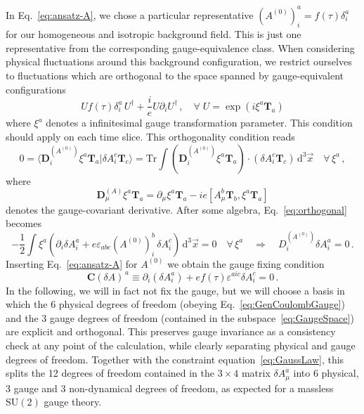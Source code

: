 In Eq.~\eqref{eq:ansatz-A}, we chose a particular representative $(A^{(0)})^a_i=f(\tau)\delta^a_i$ for our homogeneous and isotropic background field.  This is just one representative from the corresponding gauge-equivalence class.  When considering physical fluctuations around this background configuration, we restrict ourselves to fluctuations which are orthogonal to the space spanned by gauge-equivalent configurations
\begin{equation}
 U f(\tau) \delta^a_i \,  U^\dagger + \frac{i}{e} U \partial_i U^\dagger\,, \quad \forall \; U  = \exp(i \xi^a \textbf{T}_a)
 \label{eq:GaugeSpace}
\end{equation}
where $\xi^a$ denotes a infinitesimal gauge transformation parameter.  This condition should apply on each time slice. This orthogonality condition reads
\begin{equation}
 0 = \langle \mathbf{D}_i^{(A^{(0)})} \xi^a \textbf{T}_a | \delta A_i^c \textbf{T}_c \rangle = \text{Tr} \int (\mathbf{D}_i^{(A^{(0)})} \xi^a \textbf{T}_a) \cdot (\delta A_i^c \textbf{T}_c ) \, \textrm{d}^3 \vec{x} \quad \forall \, \xi^a \,,    
 \label{eq:orthogonal}
\end{equation} 
where 
\begin{equation}
 \mathbf{D}_\mu^{(A)} \xi^a \textbf{T}_a = \partial_\mu \xi^a \textbf{T}_a - i e [A_\mu^b \textbf{T}_b, \xi^a \textbf{T}_a]
 \label{eq:infinitesimal_gauge}
\end{equation}
denotes the gauge-covariant derivative. After some algebra, Eq.~\eqref{eq:orthogonal} becomes
\begin{equation}
 - \frac{1}{2} \int \xi^a (\partial_i \delta A^a_i + e \varepsilon_{a b c} (A^{(0)})^b_i \, \delta A^c_i )\, \textrm{d}^3 \vec{x}  = 0  \quad \forall \, \xi^a  \quad \Rightarrow \quad 
 D_i^{(A^{(0)})} \delta A^a_i = 0 \,.
\end{equation}
Inserting Eq.~\eqref{eq:ansatz-A} for $A^{(0)}$ we obtain the gauge fixing condition 
\begin{equation}
 \mathbf{C}(\delta A)^{\, a} \equiv  \partial_i(\delta A^a_i) + e f(\tau) \varepsilon^{a i c}  \delta A^c_i = 0 \,.
 \label{eq:GenCoulombGauge}
\end{equation}
In the following, we will in fact not fix the gauge, but we will choose a basis in which the 6 physical degrees of freedom (obeying Eq.~\eqref{eq:GenCoulombGauge}) and the 3 gauge degrees of freedom (contained in the subspace~\eqref{eq:GaugeSpace}) are explicit and orthogonal. This preserves gauge invariance as a consistency check at any point of the calculation, while clearly separating physical and gauge degrees of freedom. Together with the constraint equation~\eqref{eq:GaussLaw}, this splits the 12 degrees of freedom contained in the $3 \times 4$ matrix $\delta A^a_\mu$ into 6 physical, 3 gauge and 3 non-dynamical degrees of freedom, as expected for a massless  $\mathrm{SU}(2)$ gauge theory.

